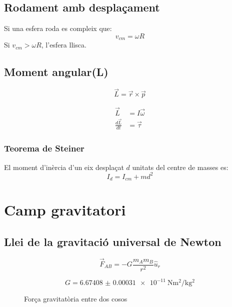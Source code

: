 \subsection{Rodament amb desplaçament}
Si una esfera roda es compleix que:
\begin{equation}
    v_{cm} = \omega R
\end{equation}
Si $v_{cm} > \omega R$, l'esfera llisca.

\subsection{Moment angular(L)}
\begin{equation}
    \vec{L} = \vec{r} \times \vec{p}
\end{equation}

\begin{align}
    \vec{L} &= I \vec{\omega} \\
    \frac{d\vec{L}}{dt} &= \vec{\tau}
\end{align}

\subsubsection{Teorema de Steiner}
El moment d'inèrcia d'un eix desplaçat $d$ unitats del centre de masses es:
\begin{equation}
    I_d = I_{cm} + m d^2
\end{equation}

\section{Camp gravitatori}
\label{sec:camp_gravitatori}

\subsection{Llei de la gravitació universal de Newton}
\label{sub:llei_de_la_gravitacio_universal}
\begin{equation} \label{eq:gravitacio_universal}
    \vec{F}_{AB} = -G\frac{m_Am_B}{r^2} \hat{u}_r
\end{equation}

\begin{equation}\label{eq:constant_grav_universal}
    G = \SI{6.67408(31)e-11}{\newton\metre\squared\per\kilo\gram\squared}
\end{equation}

\begin{figure}[H]
    \centering
    \caption{Força gravitatòria entre dos cosos}
    \label{fig:forca_grav}
\end{figure}

